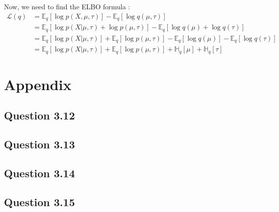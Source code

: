 \documentclass{article}
\begin{document}
Now, we need to find the ELBO formula :
\begin{equation}
    \begin{split}
        \mathcal{L}(q) & = \mathbb{E}_q[\log p(X, \mu, \tau)] - \mathbb{E}_q[\log q(\mu, \tau)]                                                         \\
                       & = \mathbb{E}_q[\log p(X|\mu, \tau) + \log p(\mu, \tau)] - \mathbb{E}_q[\log q(\mu) + \log q(\tau)]                             \\
                       & = \mathbb{E}_q[\log p(X|\mu, \tau)] + \mathbb{E}_q[\log p(\mu, \tau)] - \mathbb{E}_q[\log q(\mu)] - \mathbb{E}_q[\log q(\tau)] \\
                       & = \mathbb{E}_q[\log p(X|\mu, \tau)] + \mathbb{E}_q[\log p(\mu, \tau)] + \mathbb{H}_q[\mu] + \mathbb{H}_q[\tau]
    \end{split}
\end{equation}

\newpage
\appendix

\section{Appendix}
\subsection{Question 3.12}\label{appendix:code.3.12}


\subsection{Question 3.13}\label{appendix:code.3.13}


\subsection{Question 3.14}\label{appendix:code.3.14}


\subsection{Question 3.15}\label{appendix:code.3.15}

\end{document}
